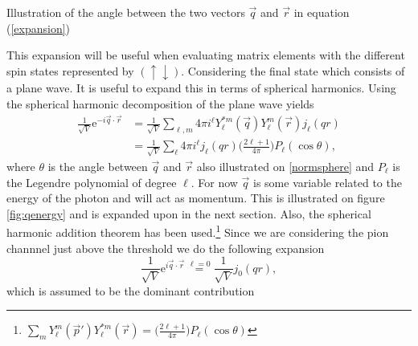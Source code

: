 \begin{marginfigure}
	\centering
	
	\caption{Illustration of the angle between the two vectors $\vec{q}$ and $\vec{r}$ in equation (\ref{expansion})}
	\label{normsphere}
\end{marginfigure}
This expansion will be useful when evaluating matrix elements with the different spin states represented by $(\uparrow \downarrow)$. Considering the final state which consists of a plane wave. It is useful to expand this in terms of spherical harmonics. Using the spherical harmonic decomposition of the plane wave yields
\begin{align}\label{planewaveexpansion}
    \frac{1}{\sqrt{V}} \text{e}^{-i\vec{q}\cdot\vec{r}} &= \frac{1}{\sqrt{V}} \sum_{\ell,m} 4\pi i^\ell Y_\ell^{*m}(\vec{q})Y_\ell^m(\vec{r})j_\ell(qr) \\
    &= \frac{1}{\sqrt{V}} \sum_\ell 4\pi i^\ell j_\ell(qr) \bigg( \frac{2\ell+1}{4\pi}\bigg)P_\ell(\cos\theta),
\end{align}
where $\theta$ is the angle between $\vec{q}$ and $\vec{r}$ also illustrated on \ref{normsphere} and $P_\ell$ is the Legendre polynomial of degree $\ell$. For now $\vec{q}$ is some variable related to the energy of the photon and will act as momentum. This is illustrated on figure \ref{fig:qenergy} and is expanded upon in the next section. Also, the spherical harmonic addition theorem has been used.\footnote{$\sum_m Y_\ell^m(\vec{p}')Y_\ell^{*m}(\vec{r})=\big( \frac{2\ell+1}{4\pi}\big)P_\ell(\cos\theta)$} Since we are considering the pion channnel just above the threshold we do the following expansion
\begin{equation} \label{expansion}
\frac{1}{\sqrt{V}}\text{e}^{i\vec{q}\cdot \vec{r}} \stackrel{\ell=0}{=} \frac{1}{\sqrt{V}}j_0(qr),    
\end{equation}
which is assumed to be the dominant contribution
